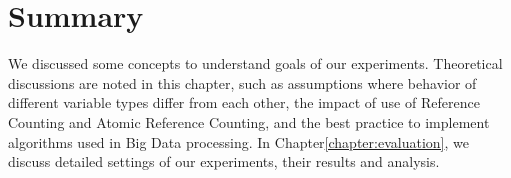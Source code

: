 \section{Summary}
\label{sec:concept_summary}
We discussed some concepts to understand goals of our experiments. 
Theoretical discussions are noted in this chapter, such as assumptions where behavior of different variable types differ from each other, the impact of use of Reference Counting and Atomic Reference Counting, 
and the best practice to implement algorithms used in Big Data processing. In Chapter\ref{chapter:evaluation}, we discuss detailed settings of our experiments, their results and analysis.


\clearpage
